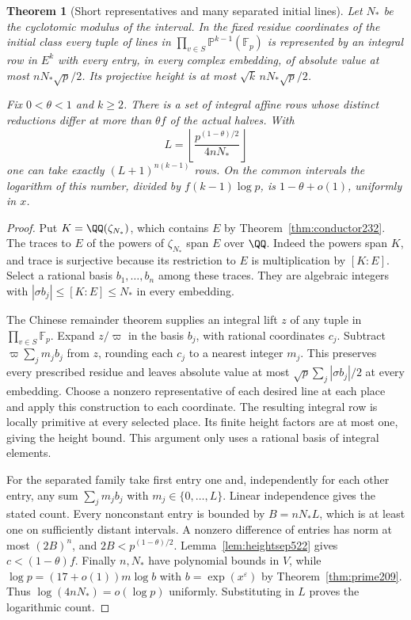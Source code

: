 \documentclass[a4paper,11pt]{article}
\newtheorem{theorem}[proposition]{Theorem}
\theoremstyle{definition}
\theoremstyle{remark}
\numberwithin{equation}{section}
\begin{document}
\begin{theorem}[Short representatives and many separated initial lines]
\leavevmode\label{thm:terminalreps522}
Let \(N_*\) be the cyclotomic modulus of the interval. In the fixed
residue coordinates of the initial class every tuple of lines in
\(\prod_{v\in S}\mathbb P^{k-1}(\mathbb F_p)\) is represented by an
integral row in \(E^k\) with every entry, in every complex embedding,
of absolute value at most \(nN_*\sqrt p/2\). Its projective height
is at most \(\sqrt{k}\,nN_*\sqrt p/2\).

Fix \(0<\theta<1\) and \(k\ge2\). There is a set of integral affine
rows whose distinct reductions differ at more than \(\theta f\) of
the actual halves. With
\[
 L=\left\lfloor\frac{p^{(1-\theta)/2}}{4nN_*}\right\rfloor
\]
one can take exactly \((L+1)^{n(k-1)}\) rows. On the common
intervals the logarithm of this number, divided by
\(f(k-1)\log p\), is \(1-\theta+o(1)\), uniformly in \(x\).
\end{theorem}
\begin{proof}
Put \(K=\QQ(\zeta_{N_*})\), which contains \(E\) by
Theorem~\ref{thm:conductor232}. The traces to \(E\) of the powers of
\(\zeta_{N_*}\) span \(E\) over \(\QQ\). Indeed the powers span
\(K\), and trace is surjective because its restriction to \(E\) is
multiplication by \([K:E]\). Select a rational basis
\(b_1,\ldots,b_n\) among these traces. They are algebraic integers
with \(|\sigma b_j|\le [K:E]\le N_*\) in every embedding.

The Chinese remainder theorem supplies an integral lift \(z\) of
any tuple in \(\prod_{v\in S}\mathbb F_p\). Expand \(z/\varpi\) in
the basis \(b_j\), with rational coordinates \(c_j\). Subtract
\(\varpi\sum_j m_j b_j\) from \(z\), rounding each \(c_j\) to a nearest
integer \(m_j\). This preserves every prescribed residue and leaves
absolute value at most \(\sqrt p\sum_j|\sigma b_j|/2\) at every
embedding. Choose a nonzero representative of each desired line at
each place and apply this construction to each coordinate. The
resulting integral row is locally primitive at every selected place.
Its finite height factors are at most one, giving the height bound.
This argument only uses a rational basis of integral elements.

For the separated family take first entry one and, independently for
each other entry, any sum \(\sum_j m_j b_j\) with
\(m_j\in\{0,\ldots,L\}\). Linear independence gives the stated
count. Every nonconstant entry is bounded by \(B=nN_*L\), which is
at least one on sufficiently distant intervals. A nonzero difference
of entries has norm at most \((2B)^n\), and \(2B<p^{(1-\theta)/2}\).
Lemma~\ref{lem:heightsep522} gives \(c<(1-\theta)f\). Finally \(n,N_*\)
have polynomial bounds in \(V\), while \(\log p=(17+o(1))m\log b\)
with \(b=\exp(x^\varepsilon)\) by Theorem~\ref{thm:prime209}. Thus
\(\log(4nN_*)=o(\log p)\) uniformly. Substituting in \(L\) proves
the logarithmic count.
\end{proof}
\end{document}
